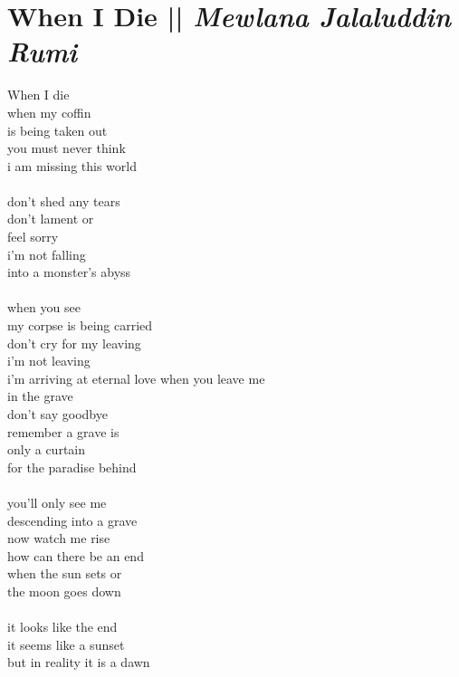 \section[When I Die]{When I Die || \emph{Mewlana Jalaluddin Rumi} \hspace*{\fill}  \thepage}
\vspace*{1cm}
\begin{flushleft}
\begin{paracol}{3} 
When I die\\
when my coffin\\
is being taken out\\
you must never think\\
i am missing this world\\ \-\ \\
don't shed any tears\\
don't lament or\\
feel sorry\\
i'm not falling\\
into a monster's abyss\\ \-\ \\
when you see\\
my corpse is being carried\\
don't cry for my leaving\\
i'm not leaving\\
i'm arriving at eternal love
\switchcolumn[1]
when you leave me\\
in the grave\\
don't say goodbye\\
remember a grave is\\
only a curtain\\
for the paradise behind\\ \-\ \\
you'll only see me\\
descending into a grave\\
now watch me rise\\
how can there be an end\\
when the sun sets or\\
the moon goes down\\ \-\ \\
it looks like the end\\
it seems like a sunset\\
but in reality it is a dawn\\

\end{paracol}
\end{flushleft}

